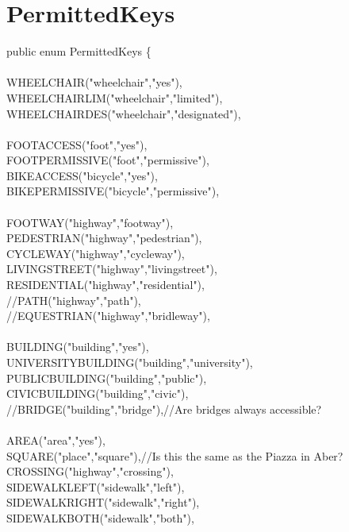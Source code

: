 \section{PermittedKeys}
public enum PermittedKeys \{\\
	\\
	WHEELCHAIR("wheelchair","yes"),\\
	WHEELCHAIR\textunderscore LIM("wheelchair","limited"),\\
	WHEELCHAIR\textunderscore DES("wheelchair","designated"),\\
	\\
	FOOT\textunderscore ACCESS("foot","yes"),\\
	FOOT\textunderscore PERMISSIVE("foot","permissive"),\\
	BIKE\textunderscore ACCESS("bicycle","yes"),\\
	BIKE\textunderscore PERMISSIVE("bicycle","permissive"),\\
\\
	FOOTWAY("highway","footway"),\\
	PEDESTRIAN("highway","pedestrian"),\\
	CYCLEWAY("highway","cycleway"),\\
	LIVING\textunderscore STREET("highway","living\textunderscore street"),\\
	RESIDENTIAL("highway","residential"),\\
	//PATH("highway","path"),\\
	//EQUESTRIAN("highway","bridleway"),\\
	\\
	BUILDING("building","yes"),\\
	UNIVERSITY\textunderscore BUILDING("building","university"),\\
	PUBLIC\textunderscore BUILDING("building","public"),\\
	CIVIC\textunderscore BUILDING("building","civic"),\\
	//BRIDGE("building","bridge"),//Are bridges always accessible?\\
	\\
	AREA("area","yes"),\\
	SQUARE("place","square"),//Is this the same as the Piazza in Aber?\\
	CROSSING("highway","crossing"),\\
	SIDEWALK\textunderscore LEFT("sidewalk","left"),\\
	SIDEWALK\textunderscore RIGHT("sidewalk","right"),\\
	SIDEWALK\textunderscore BOTH("sidewalk","both"),\\
